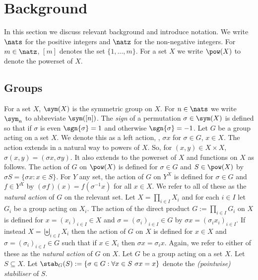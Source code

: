 \documentclass{toc}
\begin{document}
\section{Background}\label{sec:background}
In this section we discuss relevant background and introduce notation.
We write $\nats$ for the positive integers and $\natz$ for the non-negative
integers. For $m \in \natz$, $[m]$ denotes the set $\{1, \ldots, m \}$. For a
set $X$ we write $\pow(X)$ to denote the powerset of $X$.
\subsection{Groups}
For a set $X$, $\sym(X)$ is the symmetric group on $X$. For $n \in \nats$ we
write $\sym_n$ to abbreviate $\sym([n])$. The \emph{sign} of a permutation
$\sigma \in \sym(X)$ is defined so that if $\sigma$ is even $\sgn{\sigma} = 1$
and otherwise $\sgn{\sigma} = -1$.
Let $G$ be a group acting on a set $X$. We denote this as a left action, \ie,
$\sigma x$ for $\sigma \in G$, $x \in X$. The action extends in a natural way to
powers of $X$. So, for $(x,y) \in X \times X$, $\sigma(x,y) = (\sigma x,\sigma
y)$. It also extends to the powerset of $X$ and functions on $X$ as follows. The
action of $G$ on $\pow(X)$ is defined for $\sigma \in G$ and $S \in \pow(X)$ by
$\sigma S = \{\sigma x : x \in S\}$. For $Y$ any set, the action of $G$ on $Y^X$
is defined for $\sigma \in G$ and $f\in Y^X$ by $(\sigma f) (x) = f(\sigma^{-1} x)$
for all $x \in X$. We refer to all of these as the \emph{natural action} of $G$
on the relevant set.
Let $X = \prod_{i \in I} X_i$ and for each $i \in I$ let $G_i$ be a group acting
on $X_i$. The action of the direct product $G := \prod_{i \in I}G_i$ on $X$ is
defined for $x = (x_i)_{i \in I} \in X$ and $\sigma = (\sigma_i)_{i \in I} \in
G$ by $\sigma x = (\sigma_i x_i)_{i \in I}$. If instead $X = \biguplus_{i \in
  I}X_i$ then the action of $G$ on $X$ is defined for $x \in X$ and $\sigma =
(\sigma_i)_{i \in I} \in G$ such that if $x \in X_i$ then $\sigma x = \sigma_i
x$. Again, we refer to either of these as the \emph{natural action} of $G$ on
$X$.
Let $G$ be a group acting on a set $X$. Let $S \subseteq X$. Let $\stab_G(S) :=
\{\sigma \in G : \forall x \in S \,\, \sigma x = x\}$ denote the
\emph{(pointwise) stabiliser} of $S$.
\end{document}
